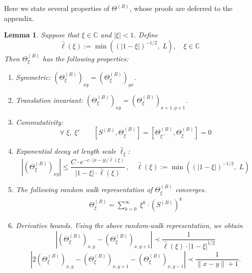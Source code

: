 \documentclass[10pt,reqno]{article}
\theoremstyle{plain} %
\newtheorem{lemma}[theorem]{Lemma}
\theoremstyle{remark}
\numberwithin{equation}{section}
\begin{document}
Here we state several properties of $ \Theta^{(B)}$, whose proofs are deferred to the appendix. 
\begin{lemma}\label{lem_propTH}
Suppose that  $\xi\in \mathbb C$   and $|\xi|< 1$.  Define
$$
 \hat{\ell}(\xi) := \min\left((|1-\xi|)^{-1/2},\; L\right),\quad \xi\in \mathbb C 
$$
Then  $\Theta^{(B)}_\xi$ has the following properties:
\begin{enumerate}
    \item Symmetric: $ (\Theta^{(B)}_{\xi})_{xy}= (\Theta^{(B)}_{\xi})_{yx}$.
    \item Translation invariant: $
    (\Theta^{(B)}_{\xi})_{xy}= (\Theta^{(B)}_{\xi})_{x+1, y+1}$.
    \item Commutativity:  
    $$
    \forall \;  \xi, \; \xi' \quad \quad  [S^{(B)}, \Theta^{(B)}_{\xi}]=[\Theta^{(B)}_{\xi\,'}, \Theta^{(B)}_{\xi}]=0
    $$
     \item Exponential decay at length scale $\hat \ell_\xi $:
     \begin{equation}\label{prop:ThfadC}    \left| (\Theta^{(B)}_{\xi})_{xy}\right|\le \frac{C\cdot e^{-c\cdot|x-y|\big/ \hat{\ell}(\xi)}}{|1-\xi|\cdot \hat \ell (\xi)}\,,\quad   \hat{\ell}(\xi) := \min\left((|1-\xi|)^{-1/2},\; L\right)  
     \end{equation}
     
     \item The following  random walk representation of $\Theta_\xi^{(B)}$ converges.
     \begin{align}\nonumber
     \Theta_\xi^{(B)}=\sum_{k=0}^{\infty}\;  \xi^k \cdot \left(S^{(B)}\right)^k
     \end{align} 

     
     \item Derivative bounds. Using the above random-walk representation, we obtain
     \begin{equation}\label{prop:BD1}     
    \left| (\Theta^{(B)}_{\xi})_{x, y}-(\Theta^{(B)}_{\xi})_{x,{y+1}}\right|\prec \frac{1}{\hat{ \ell}(\xi)\cdot |1-\xi|^{1/2} }   
     \end{equation}
 \begin{equation}\label{prop:BD2}     
     \left|2 (\Theta^{(B)}_{\xi})_{x, y}-(\Theta^{(B)}_{\xi})_{x,{y+1}}-(\Theta^{(B)}_{\xi})_{x,{y-1}}\right|\prec  \frac{1}{\|x-y\|+1 } . 
     \end{equation}
\end{enumerate}
\end{lemma}
\end{document}
